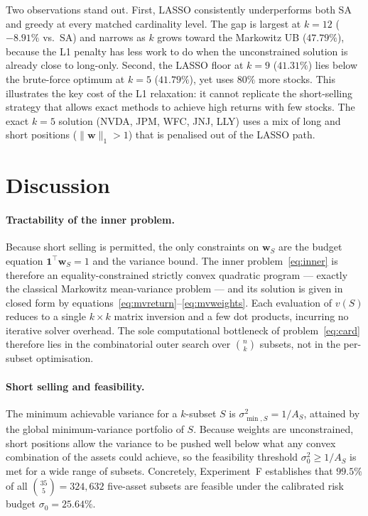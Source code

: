 \documentclass[11pt]{article}
\begin{document}
Two observations stand out.  First, LASSO consistently underperforms both SA
and greedy at every matched cardinality level.  The gap is largest at $k=12$
($-8.91\%$ vs.\ SA) and narrows as $k$ grows toward the Markowitz UB ($47.79\%$),
because the L1 penalty has less work to do when the unconstrained solution is already
close to long-only.  Second, the LASSO floor at $k=9$ ($41.31\%$) lies below the
brute-force optimum at $k=5$ ($41.79\%$), yet uses $80\%$ more stocks.
This illustrates the key cost of the L1 relaxation: it cannot replicate the
short-selling strategy that allows exact methods to achieve high returns with few
stocks.  The exact $k=5$ solution (NVDA, JPM, WFC, JNJ, LLY) uses a mix of
long and short positions ($\|\mathbf{w}\|_1>1$) that is penalised out of the
LASSO path.

\section{Discussion}
\label{sec:discussion}

\paragraph{Tractability of the inner problem.}
Because short selling is permitted, the only constraints on $\mathbf{w}_S$ are
the budget equation $\mathbf{1}^\top\mathbf{w}_S=1$ and the variance bound.
The inner problem~\eqref{eq:inner} is therefore an equality-constrained strictly
convex quadratic program --- exactly the classical Markowitz mean-variance
problem --- and its solution is given in closed form by
equations~\eqref{eq:mvreturn}--\eqref{eq:mvweights}.  Each evaluation of $v(S)$
reduces to a single $k\times k$ matrix inversion and a few dot products,
incurring no iterative solver overhead.  The sole computational bottleneck of
problem~\eqref{eq:card} therefore lies in the combinatorial outer search over
$\binom{n}{k}$ subsets, not in the per-subset optimisation.

\paragraph{Short selling and feasibility.}
The minimum achievable variance for a $k$-subset $S$ is $\sigma^2_{\min,S}=1/A_S$,
attained by the global minimum-variance portfolio of $S$.  Because weights are
unconstrained, short positions allow the variance to be pushed well below what
any convex combination of the assets could achieve, so the feasibility threshold
$\sigma_0^2 \geq 1/A_S$ is met for a wide range of subsets.  Concretely,
Experiment~F establishes that $99.5\%$ of all $\binom{35}{5}=324{,}632$
five-asset subsets are feasible under the calibrated risk budget $\sigma_0=25.64\%$.
\end{document}
